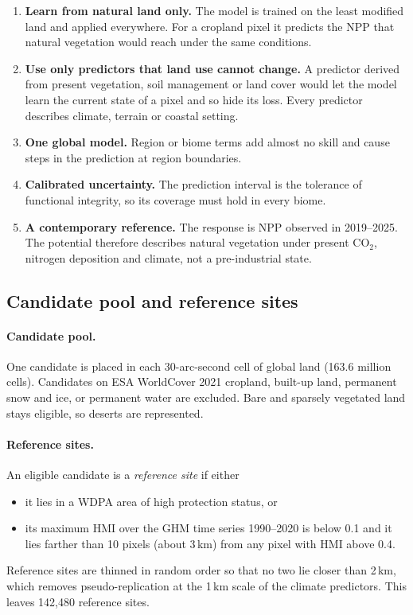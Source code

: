 \documentclass[11pt,a4paper]{article}
\begin{document}
\begin{enumerate}
\item \textbf{Learn from natural land only.} The model is trained on the least modified land and
applied everywhere. For a cropland pixel it predicts the NPP that natural vegetation would
reach under the same conditions.
\item \textbf{Use only predictors that land use cannot change.} A predictor derived from present
vegetation, soil management or land cover would let the model learn the current state of a pixel
and so hide its loss. Every predictor describes climate, terrain or coastal setting.
\item \textbf{One global model.} Region or biome terms add almost no skill and cause steps in the
prediction at region boundaries.
\item \textbf{Calibrated uncertainty.} The prediction interval is the tolerance of functional
integrity, so its coverage must hold in every biome.
\item \textbf{A contemporary reference.} The response is NPP observed in 2019--2025. The
potential therefore describes natural vegetation under present CO$_2$, nitrogen deposition and
climate, not a pre-industrial state.
\end{enumerate}

\subsection{Candidate pool and reference sites}

\paragraph{Candidate pool.} One candidate is placed in each 30-arc-second cell of global land
(163.6 million cells). Candidates on ESA WorldCover 2021 cropland, built-up land, permanent snow
and ice, or permanent water are excluded. Bare and sparsely vegetated land stays eligible, so
deserts are represented.

\paragraph{Reference sites.} An eligible candidate is a \emph{reference site} if either
\begin{itemize}
\item it lies in a WDPA area of high protection status, or
\item its maximum HMI over the GHM time series 1990--2020 is below 0.1 and it lies farther than
10 pixels (about 3\,km) from any pixel with HMI above 0.4.
\end{itemize}
Reference sites are thinned in random order so that no two lie closer than 2\,km, which removes
pseudo-replication at the 1\,km scale of the climate predictors. This leaves 142,480 reference
sites.
\end{document}
